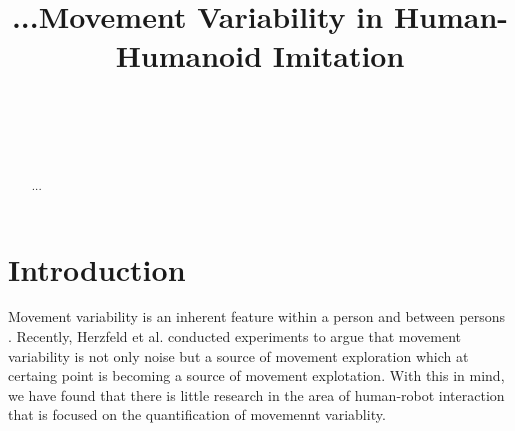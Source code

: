 \documentclass{sigchi}
\def\plaintitle{...Movement Variability in Human-Humanoid Imitation}
\def\plainkeywords{Authors' choice; of terms; separated; by
  semicolons; include commas, within terms only; required.}
\begin{document}
\title{\plaintitle}

\author{%
  \\
  \\
  \\
}

\maketitle

\begin{abstract}
  ...
\end{abstract}

 



\section{Introduction}

Movement variability is an inherent feature within a person and between persons
\cite{newell1993variability}. Recently, Herzfeld et al. \cite{Herzfeld2014}
conducted experiments to argue that movement variability is not only noise but a
source of movement exploration which at certaing point is becoming a source
of movement explotation.
With this in mind, we have found that there is little research in the area of
human-robot interaction that is focused on the quantification of movemennt variablity.
\end{document}
